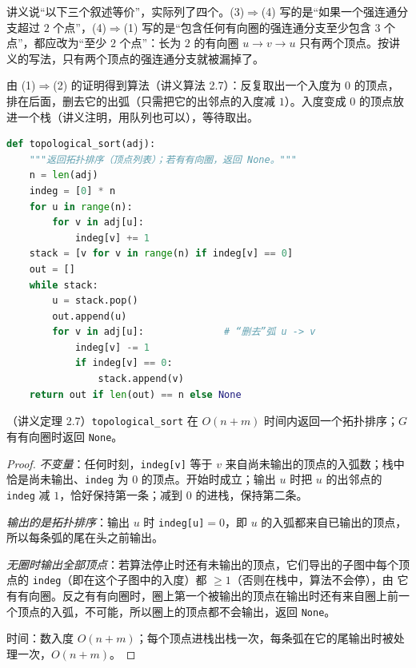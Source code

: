 \begin{remark}[讲义的错误]
讲义说“以下三个叙述等价”，实际列了四个。(3)$\Rightarrow$(4) 写的是“如果一个强连通分支超过 $2$ 个点”，(4)$\Rightarrow$(1) 写的是“包含任何有向圈的强连通分支至少包含 $3$ 个点”，都应改为“至少 $2$ 个点”：长为 $2$ 的有向圈 $u\to v\to u$ 只有两个顶点。按讲义的写法，只有两个顶点的强连通分支就被漏掉了。
\end{remark}

由 (1)$\Rightarrow$(2) 的证明得到算法（讲义算法 2.7）：反复取出一个入度为 $0$ 的顶点，排在后面，删去它的出弧（只需把它的出邻点的入度减 $1$）。入度变成 $0$ 的顶点放进一个栈（讲义注明，用队列也可以），等待取出。

\begin{lstlisting}[language=Python]
def topological_sort(adj):
    """返回拓扑排序（顶点列表）；若有有向圈，返回 None。"""
    n = len(adj)
    indeg = [0] * n
    for u in range(n):
        for v in adj[u]:
            indeg[v] += 1
    stack = [v for v in range(n) if indeg[v] == 0]
    out = []
    while stack:
        u = stack.pop()
        out.append(u)
        for v in adj[u]:              # “删去”弧 u -> v
            indeg[v] -= 1
            if indeg[v] == 0:
                stack.append(v)
    return out if len(out) == n else None
\end{lstlisting}

\begin{theorem}\label{thm:digraph-orders:kahn}
（讲义定理 2.7）\texttt{topological\_sort} 在 $O(n+m)$ 时间内返回一个拓扑排序；$G$ 有有向圈时返回 \texttt{None}。
\end{theorem}
\begin{proof}
\emph{不变量}：任何时刻，\texttt{indeg[v]} 等于 $v$ 来自尚未输出的顶点的入弧数；栈中恰是尚未输出、\texttt{indeg} 为 $0$ 的顶点。开始时成立；输出 $u$ 时把 $u$ 的出邻点的 \texttt{indeg} 减 $1$，恰好保持第一条；减到 $0$ 的进栈，保持第二条。

\emph{输出的是拓扑排序}：输出 $u$ 时 \texttt{indeg[u]}$=0$，即 $u$ 的入弧都来自已输出的顶点，所以每条弧的尾在头之前输出。

\emph{无圈时输出全部顶点}：若算法停止时还有未输出的顶点，它们导出的子图中每个顶点的 \texttt{indeg}（即在这个子图中的入度）都 $\geqslant1$（否则在栈中，算法不会停），由 它有有向圈。反之有有向圈时，圈上第一个被输出的顶点在输出时还有来自圈上前一个顶点的入弧，不可能，所以圈上的顶点都不会输出，返回 \texttt{None}。

时间：数入度 $O(n+m)$；每个顶点进栈出栈一次，每条弧在它的尾输出时被处理一次，$O(n+m)$。
\end{proof}

